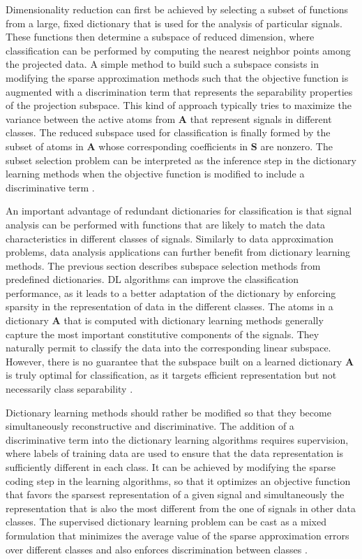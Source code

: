 Dimensionality reduction can first be achieved by selecting a subset of functions from a large, fixed dictionary that is used for the analysis of particular signals. These functions then determine a subspace of reduced dimension, where classification can be performed by computing the nearest neighbor points among the projected data. A simple method to build such a subspace consists in modifying the sparse approximation methods such that the objective function is augmented with a discrimination term that represents the separability properties of the projection subspace. This kind of approach typically tries to maximize the variance between the active atoms from $\boldsymbol{A}$ that represent signals in different classes. The reduced subspace used for classification is finally formed by the subset of atoms in $\boldsymbol{A}$ whose corresponding coefficients in $\boldsymbol{S}$ are nonzero. The subset selection problem can be interpreted as the inference step in the dictionary learning methods when the objective function is modified to include a discriminative term \cite{tosic2011dictionary}.

An important advantage of redundant dictionaries for classification is that signal analysis can be performed with functions that are likely to match the data characteristics in different classes of signals. Similarly to data approximation problems, data analysis applications can further benefit from dictionary learning methods. The previous section describes subspace selection methods from predefined dictionaries. DL algorithms can improve the classification performance, as it leads to a better adaptation of the dictionary by enforcing sparsity in the representation of data in the different classes. The atoms in a dictionary $\boldsymbol{A}$ that is computed with dictionary learning methods generally capture the most important constitutive components of the signals. They naturally permit to classify the data into the corresponding linear subspace. However, there is no guarantee that the subspace built on a learned dictionary $\boldsymbol{A}$ is truly optimal for classification, as it targets efficient representation but not necessarily class separability \cite{tosic2011dictionary}.

Dictionary learning methods should rather be modified so that they become simultaneously reconstructive and discriminative. The addition of a discriminative term into the dictionary learning algorithms requires supervision, where labels of training data are used to ensure that the data representation is sufficiently different in each class. It can be achieved by modifying the sparse coding step in the learning algorithms, so that it optimizes an objective function that favors the sparsest representation of a given signal and simultaneously the representation that is also the most different from the one of signals in other data classes. The supervised dictionary learning problem can be cast as a mixed formulation that minimizes the average value of the sparse approximation errors over different classes and also enforces discrimination between classes \cite{tosic2011dictionary}.

